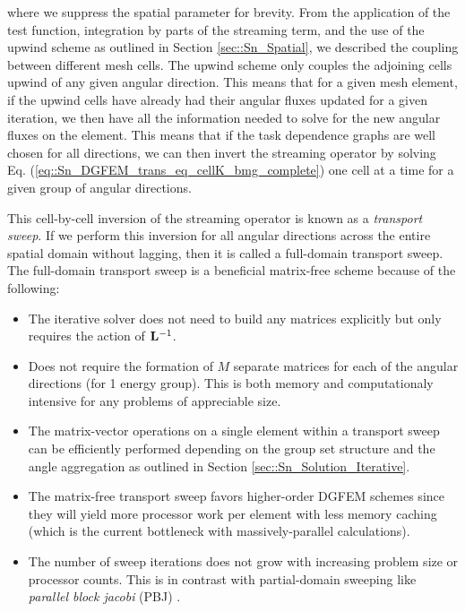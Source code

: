 \noindent where we suppress the spatial parameter for brevity. From the application of the test function, integration by parts of the streaming term, and the use of the upwind scheme as outlined in Section \ref{sec::Sn_Spatial}, we described the coupling between different mesh cells. The upwind scheme only couples the adjoining cells upwind of any given angular direction. This means that for a given mesh element, if the upwind cells have already had their angular fluxes updated for a given iteration, we then have all the information needed to solve for the new angular fluxes on the element. This means that if the task dependence graphs are well chosen for all directions, we can then invert the streaming operator by solving Eq. (\ref{eq::Sn_DGFEM_trans_eq_cellK_bmg_complete}) one cell at a time for a given group of angular directions. 

This cell-by-cell inversion of the streaming operator is known as a {\em transport sweep}. If we perform this inversion for all angular directions across the entire spatial domain without lagging, then it is called a full-domain transport sweep. The full-domain transport sweep is a beneficial matrix-free scheme because of the following:

\begin{itemize}
\item The iterative solver does not need to build any matrices explicitly but only requires the action of ${\bf L}^{-1}$.
\item Does not require the formation of $M$ separate matrices for each of the angular directions (for 1 energy group). This is both memory and computationaly intensive for any problems of appreciable size.
\item The matrix-vector operations on a single element within a transport sweep can be efficiently performed depending on the group set structure and the angle aggregation as outlined in Section \ref{sec::Sn_Solution_Iterative}.
\item The matrix-free transport sweep favors higher-order DGFEM schemes since they will yield more processor work per element with less memory caching (which is the current bottleneck with massively-parallel calculations).
\item The number of sweep iterations does not grow with increasing problem size or processor counts. This is in contrast with partial-domain sweeping like {\em parallel block jacobi} (PBJ) \cite{zerr2011solution}.
\end{itemize}

